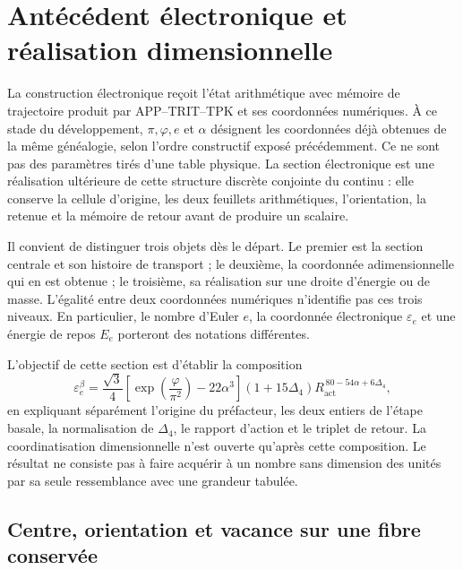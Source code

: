 \section{Antécédent électronique et réalisation dimensionnelle}
\label{sec:electron}

La construction électronique reçoit l'état arithmétique avec mémoire de trajectoire produit par APP--TRIT--TPK et ses coordonnées numériques. À ce stade du développement, \(\pi,\varphi,e\) et \(\alpha\) désignent les coordonnées déjà obtenues de la même généalogie, selon l'ordre constructif exposé précédemment. Ce ne sont pas des paramètres tirés d'une table physique. La section électronique est une réalisation ultérieure de cette structure discrète conjointe du continu : elle conserve la cellule d'origine, les deux feuillets arithmétiques, l'orientation, la retenue et la mémoire de retour avant de produire un scalaire.

Il convient de distinguer trois objets dès le départ. Le premier est la section
centrale et son histoire de transport ; le deuxième, la coordonnée
adimensionnelle qui en est obtenue ; le troisième, sa réalisation sur une
droite d'énergie ou de masse. L'égalité entre deux coordonnées numériques
n'identifie pas ces trois niveaux. En particulier, le nombre d'Euler \(e\),
la coordonnée électronique \(\varepsilon_e\) et une énergie de repos
\(E_e\) porteront des notations différentes.

L'objectif de cette section est d'établir la composition
\begin{equation}
 \varepsilon_e^{\beta}
 =\frac{\sqrt3}{4}
  \left[\exp\!\left(\frac{\varphi}{\pi^2}\right)-22\alpha^3\right]
  (1+15\Delta_4)
  R_{\mathrm{act}}^{\,80-54\alpha+6\Delta_4},
 \label{eq:el-formula-completa}
\end{equation}
en expliquant séparément l'origine du préfacteur, les deux entiers de
l'étape basale, la normalisation de \(\Delta_4\), le rapport d'action et le
triplet de retour. La coordinatisation dimensionnelle n'est ouverte qu'après
cette composition. Le résultat ne consiste pas à faire acquérir à un nombre
sans dimension des unités par sa seule ressemblance avec une grandeur
tabulée.



\subsection{Centre, orientation et vacance sur une fibre conservée}

